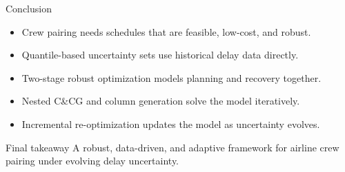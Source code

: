 \documentclass[aspectratio=169]{beamer}
\begin{document}
\begin{frame}{Conclusion}
  \begin{itemize}
    \item Crew pairing needs schedules that are feasible, low-cost, and robust.
    \item Quantile-based uncertainty sets use historical delay data directly.
    \item Two-stage robust optimization models planning and recovery together.
    \item Nested C\&CG and column generation solve the model iteratively.
    \item Incremental re-optimization updates the model as uncertainty evolves.
  \end{itemize}

  \vspace{0.35cm}
  \begin{block}{Final takeaway}
    A robust, data-driven, and adaptive framework for airline crew pairing under evolving delay uncertainty.
  \end{block}
\end{frame}
\end{document}
